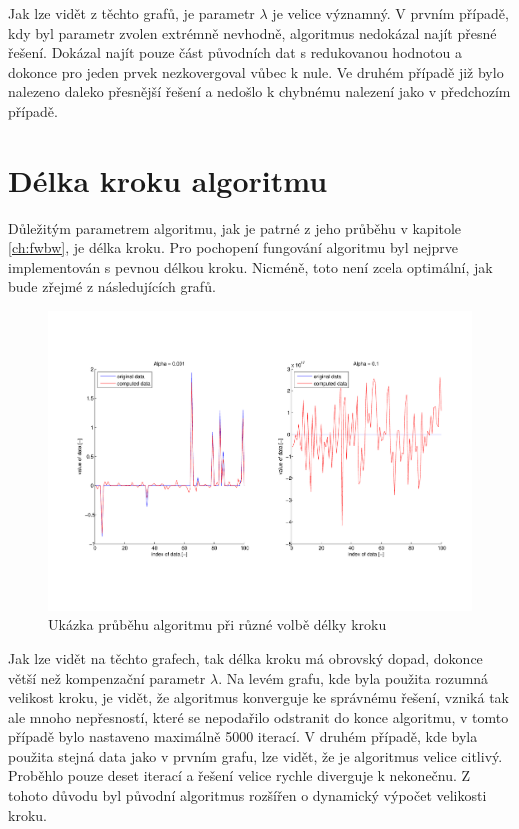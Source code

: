 \documentclass[FM,BP]{tulthesis}
\begin{document}
Jak lze vidět z těchto grafů, je parametr $\lambda$ je velice významný. V prvním případě, kdy byl parametr zvolen extrémně nevhodně, algoritmus nedokázal najít přesné řešení. Dokázal najít pouze část původních dat s redukovanou hodnotou a dokonce pro jeden prvek nezkovergoval vůbec k nule. Ve druhém případě již bylo nalezeno daleko přesnější řešení a nedošlo k chybnému nalezení jako v předchozím případě.


\section{Délka kroku algoritmu}
Důležitým parametrem algoritmu, jak je patrné z jeho průběhu v kapitole \ref{ch:fwbw}, je délka kroku. Pro pochopení fungování algoritmu byl nejprve implementován s pevnou délkou kroku. Nicméně, toto není zcela optimální, jak bude zřejmé z následujících grafů.
\begin{figure}[!ht]
\begin{center}
\includegraphics[scale=0.5]{obr/basic.pdf}
\end{center}
\caption{Ukázka průběhu algoritmu při různé volbě délky kroku}
\label{fig:basicAlpha}
\end{figure} 

Jak lze vidět na těchto grafech, tak délka kroku má obrovský dopad, dokonce větší než kompenzační parametr $\lambda$. Na levém grafu, kde byla použita rozumná velikost kroku, je vidět, že algoritmus konverguje ke správnému řešení, vzniká tak ale mnoho nepřesností, které se nepodařilo odstranit do konce algoritmu, v tomto případě bylo nastaveno maximálně 5000 iterací. V druhém případě, kde byla použita stejná data jako v prvním grafu, lze vidět, že je algoritmus velice citlivý. Proběhlo pouze deset iterací a řešení velice rychle diverguje k nekonečnu. Z tohoto důvodu byl původní algoritmus rozšířen o dynamický výpočet velikosti kroku.
\end{document}
